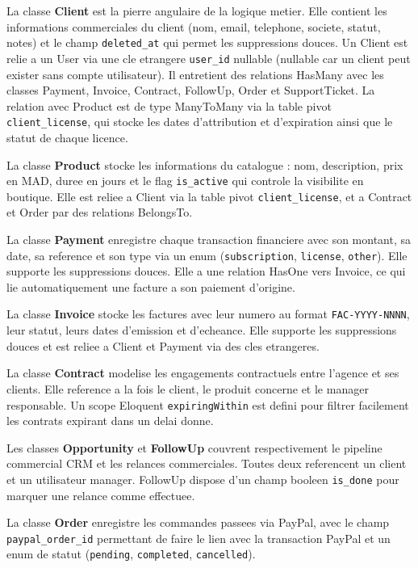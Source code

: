 La classe \textbf{Client} est la pierre angulaire de la logique metier.
Elle contient les informations commerciales du client (nom, email, telephone,
societe, statut, notes) et le champ \texttt{deleted\_at} qui permet les
suppressions douces. Un Client est relie a un User via une cle etrangere
\texttt{user\_id} nullable (nullable car un client peut exister sans
compte utilisateur). Il entretient des relations HasMany avec les classes
Payment, Invoice, Contract, FollowUp, Order et SupportTicket. La relation
avec Product est de type ManyToMany via la table pivot
\texttt{client\_license}, qui stocke les dates d'attribution et
d'expiration ainsi que le statut de chaque licence.

La classe \textbf{Product} stocke les informations du catalogue : nom,
description, prix en MAD, duree en jours et le flag \texttt{is\_active}
qui controle la visibilite en boutique. Elle est reliee a Client via la
table pivot \texttt{client\_license}, et a Contract et Order par des
relations BelongsTo.

La classe \textbf{Payment} enregistre chaque transaction financiere avec
son montant, sa date, sa reference et son type via un enum
(\texttt{subscription}, \texttt{license}, \texttt{other}). Elle supporte
les suppressions douces. Elle a une relation HasOne vers Invoice, ce qui
lie automatiquement une facture a son paiement d'origine.

La classe \textbf{Invoice} stocke les factures avec leur numero au format
\texttt{FAC-YYYY-NNNN}, leur statut, leurs dates d'emission et d'echeance.
Elle supporte les suppressions douces et est reliee a Client et Payment
via des cles etrangeres.

La classe \textbf{Contract} modelise les engagements contractuels entre
l'agence et ses clients. Elle reference a la fois le client, le produit
concerne et le manager responsable. Un scope Eloquent
\texttt{expiringWithin} est defini pour filtrer facilement les contrats
expirant dans un delai donne.

Les classes \textbf{Opportunity} et \textbf{FollowUp} couvrent
respectivement le pipeline commercial CRM et les relances commerciales.
Toutes deux referencent un client et un utilisateur manager. FollowUp
dispose d'un champ booleen \texttt{is\_done} pour marquer une relance
comme effectuee.

La classe \textbf{Order} enregistre les commandes passees via PayPal,
avec le champ \texttt{paypal\_order\_id} permettant de faire le lien
avec la transaction PayPal et un enum de statut
(\texttt{pending}, \texttt{completed}, \texttt{cancelled}).

